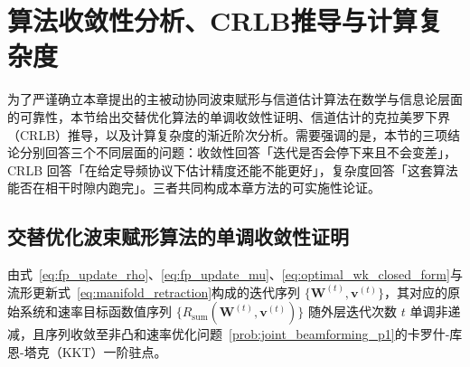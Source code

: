 \section{算法收敛性分析、CRLB推导与计算复杂度}
\label{sec:convergence_and_complexity}

为了严谨确立本章提出的主被动协同波束赋形与信道估计算法在数学与信息论层面的可靠性，本节给出交替优化算法的单调收敛性证明、信道估计的克拉美罗下界（CRLB）推导，以及计算复杂度的渐近阶次分析。需要强调的是，本节的三项结论分别回答三个不同层面的问题：收敛性回答「迭代是否会停下来且不会变差」，CRLB 回答「在给定导频协议下估计精度还能不能更好」，复杂度回答「这套算法能否在相干时隙内跑完」。三者共同构成本章方法的可实施性论证。

\subsection{交替优化波束赋形算法的单调收敛性证明}
\label{sec:convergence_proof}

\begin{theorem}[交替优化算法单调收敛性]
  \label{thm:ao_convergence}
  由式~\eqref{eq:fp_update_rho}、\eqref{eq:fp_update_mu}、\eqref{eq:optimal_wk_closed_form}与流形更新式~\eqref{eq:manifold_retraction}构成的迭代序列 $\{ \bm{W}^{(t)}, \bm{v}^{(t)} \}$，其对应的原始系统和速率目标函数值序列 $\{ R_{\mathrm{sum}}(\bm{W}^{(t)}, \bm{v}^{(t)}) \}$ 随外层迭代次数 $t$ 单调非递减，且序列收敛至非凸和速率优化问题~\eqref{prob:joint_beamforming_p1}的卡罗什-库恩-塔克（KKT）一阶驻点。
\end{theorem}

